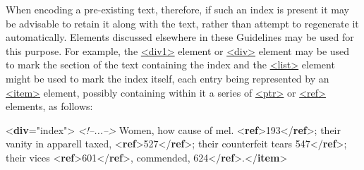 When encoding a pre-existing text, therefore, if such an index is present it may be advisable to retain it along with the text, rather than attempt to regenerate it automatically. Elements discussed elsewhere in these Guidelines may be used for this purpose. For example, the \hyperref[TEI.div1]{<div1>} element or \hyperref[TEI.div]{<div>} element may be used to mark the section of the text containing the index and the \hyperref[TEI.list]{<list>} element might be used to mark the index itself, each entry being represented by an \hyperref[TEI.item]{<item>} element, possibly containing within it a series of \hyperref[TEI.ptr]{<ptr>} or \hyperref[TEI.ref]{<ref>} elements, as follows: \par\bgroup{}\exampleFont \begin{shaded}\noindent\mbox{}{<\textbf{div}\hspace*{1em}{type}="{index}">}\mbox{}\newline 
\textit{<!--...-->}\mbox{}\newline 
{}\mbox{}\newline 
\hspace*{1em}Women, how cause of mel. {<\textbf{ref}>}193{</\textbf{ref}>}; their vanity in\mbox{}\newline 
\hspace*{1em}\hspace*{1em}\hspace*{1em}\hspace*{1em} apparell taxed, {<\textbf{ref}>}527{</\textbf{ref}>}; their counterfeit tears\mbox{}\newline 
\hspace*{1em}547{</\textbf{ref}>}; their vices {<\textbf{ref}>}601{</\textbf{ref}>}, commended,\mbox{}\newline 
\hspace*{1em}624{</\textbf{ref}>}.{</\textbf{item}>}\mbox{}\newline 

\end{shaded}
